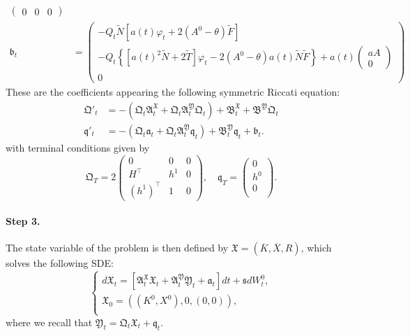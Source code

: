 \documentclass[11pt,twoside]{amsart}
\theoremstyle{definition}
\numberwithin{equation}{section}
\renewcommand{\bar}{\overline}
\begin{document}
\begin{align*}
\begin{pmatrix}
         0 & 0 & 0 
    \end{pmatrix}\\
    \mathfrak{b}_t   &=
    \begin{pmatrix}
        - Q_t \widetilde{N}\left[a(t) \varphi_t + 2(A^0-\theta) \widetilde{F} \right]\\
        - Q_t\left\{\left[a(t)^2 \widetilde{N} + 2 \widetilde{T}\right]\varphi_t - 2(A^0-\theta) a(t) \widetilde{N} \widetilde{F} \right\} + a(t)
        \begin{pmatrix}
            aA\\0
        \end{pmatrix}\\
        0
    \end{pmatrix}
\end{align*}
These are the coefficients appearing the following symmetric Riccati equation:
\begin{align*}
    \mathfrak{Q}'_t &= -(\mathfrak{Q}_t \mathfrak{A}^{\mathfrak{X}}_t + \mathfrak{Q}_t \mathfrak{A}^{\mathfrak{Y}}_t \mathfrak{Q}_t) + \mathfrak{B}^{\mathfrak{X}}_t +\mathfrak{B}^{\mathfrak{Y}}\mathfrak{Q}_t\\
    \mathfrak{q}'_t &= - ( \mathfrak{Q}_t \mathfrak{a}_t + \mathfrak{Q}_t \mathfrak{A}^{\mathfrak{Y}}_t \mathfrak{q}_t ) + \mathfrak{B}^{\mathfrak{Y}}_t \mathfrak{q}_t +\mathfrak{b}_t.
\end{align*}
with terminal conditions given by
\begin{equation*}
\mathfrak{Q}_T
= 2\begin{pmatrix}
    0 & 0 & 0\\
    H^\top & h^1 & 0\\ 
    (h^1)^\top & 1 &0
\end{pmatrix}, \quad \mathfrak{q}_T 
= \begin{pmatrix}
    0  \\
    h^0\\
    0 \\
\end{pmatrix}.
\end{equation*}




\paragraph{\textbf{Step 3.}}
The state variable of the problem is then defined by $\mathfrak{X}=(\bar K, \bar X, R)$, which solves the following SDE:
\begin{equation*}
    \begin{cases}
        d\mathfrak{X}_t = [\mathfrak{A}^{\mathfrak{X}}_t\mathfrak{X}_t + \mathfrak{A}^{\mathfrak{Y}}_t\mathfrak{Y}_t + \mathfrak{a}_t ] dt + \mathfrak{s} dW^0_t,\\
        \mathfrak{X}_0 = ((K^0, X^0), 0, (0, 0)),\\
    \end{cases}
\end{equation*}
where we recall that $\mathfrak{Y}_t =\mathfrak{Q}_t\mathfrak{X}_t + \mathfrak{q}_t$.
\end{document}
